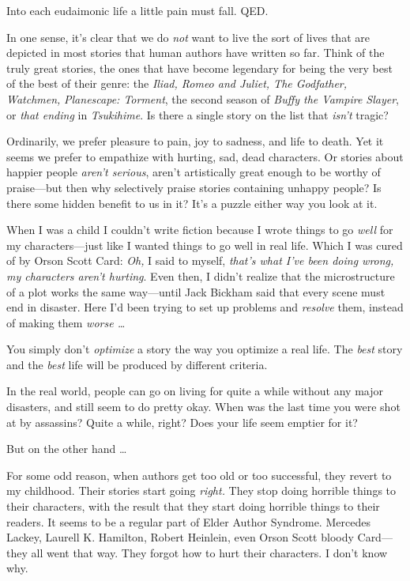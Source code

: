 {
 Into each eudaimonic life a little pain must fall. QED.}

{
 In one sense, it's clear that we do \textit{not}
want to live the sort of lives that are depicted in most stories that
human authors have written so far. Think of the truly great stories,
the ones that have become legendary for being the very best of the best
of their genre: the \textit{Iliad, Romeo and Juliet, The Godfather,
Watchmen,} \textit{Planescape: Torment}, the second season of
\textit{Buffy the Vampire Slayer}, or \textit{that ending} in
\textit{Tsukihime}. Is there a single story on the list that
\textit{isn't} tragic?}

{
 Ordinarily, we prefer pleasure to pain, joy to sadness, and life
to death. Yet it seems we prefer to empathize with hurting, sad, dead
characters. Or stories about happier people
\textit{aren't serious}, aren't
artistically great enough to be worthy of praise---but then why
selectively praise stories containing unhappy people? Is there some
hidden benefit to us in it? It's a puzzle either way
you look at it.}

{
 When I was a child I couldn't write fiction
because I wrote things to go \textit{well} for my characters---just
like I wanted things to go well in real life. Which I was cured of by
Orson Scott Card: \textit{Oh,} I said to myself,
\textit{that's what I've been doing
wrong, my characters aren't hurting}. Even then, I
didn't realize that the microstructure of a plot works
the same way---until Jack Bickham said that every scene must end in
disaster. Here I'd been trying to set up problems and
\textit{resolve} them, instead of making them \textit{worse \ldots}}

{
 You simply don't \textit{optimize} a story the way
you optimize a real life. The \textit{best} story and the \textit{best}
life will be produced by different criteria.}

{
 In the real world, people can go on living for quite a while
without any major disasters, and still seem to do pretty okay. When was
the last time you were shot at by assassins? Quite a while, right? Does
your life seem emptier for it?}

{
 But on the other hand \ldots}

{
 For some odd reason, when authors get too old or too successful,
they revert to my childhood. Their stories start going \textit{right.}
They stop doing horrible things to their characters, with the result
that they start doing horrible things to their readers. It seems to be
a regular part of Elder Author Syndrome. Mercedes Lackey, Laurell K.
Hamilton, Robert Heinlein, even Orson Scott bloody Card---they all went
that way. They forgot how to hurt their characters. I
don't know why.}

